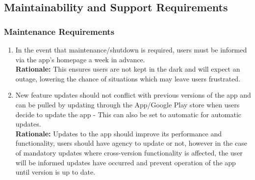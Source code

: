 \documentclass[]{article}
\begin{document}

\subsection{Maintainability and Support Requirements}
\label{sub:maintainability_and_support_requirements}

\subsubsection{Maintenance Requirements}
\label{ssub:maintenance_requirements}
\begin{enumerate}[{MS-M}1. ]
	\item In the event that maintenance/shutdown is required, users must be informed via the app's homepage a week in advance.\\
	{\bf Rationale:} This ensures users are not kept in the dark and will expect an outage, lowering the chance of situations which may leave users frustrated.
	\item New feature updates should not conflict with previous versions of the app and can be pulled by updating through the App/Google Play store when users decide to update the app - This can also be set to automatic for automatic updates.\\
	{\bf Rationale:} Updates to the app should improve its performance and functionality, users should have agency to update or not, however in the case of mandatory updates where cross-version functionality is affected, the user will be informed updates have occurred and prevent operation of the app until version is up to date.
\end{enumerate}
\end{document}
